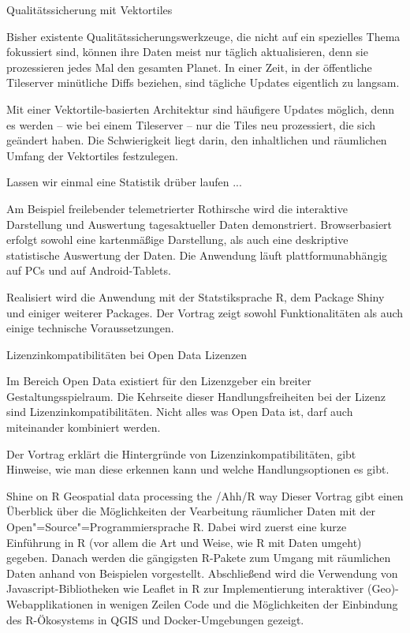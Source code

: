 %
{Qualitätssicherung mit Vektortiles}%
{}%
{Bisher existente Qualitätssicherungswerkzeuge, die nicht auf ein spezielles Thema fokussiert sind,
  können ihre Daten meist nur täglich aktualisieren, denn sie prozessieren jedes Mal den gesamten
  Planet. In einer Zeit, in der öffentliche Tileserver minütliche Diffs beziehen, sind tägliche
  Updates eigentlich zu langsam.

Mit einer Vektortile-basierten Architektur sind häufigere Updates möglich, denn es werden – wie bei
einem Tileserver – nur die Tiles neu prozessiert, die sich geändert haben. Die Schwierigkeit liegt
darin, den inhaltlichen und räumlichen Umfang der Vektortiles festzulegen.}

%
{Lassen wir einmal eine Statistik drüber laufen ...}%
{}%
{Am Beispiel freilebender telemetrierter Rothirsche wird die interaktive Darstellung und Auswertung
tagesaktueller Daten demonstriert. Browserbasiert erfolgt sowohl eine kartenmäßige Darstellung,
als auch eine deskriptive statistische Auswertung der Daten.
Die Anwendung läuft plattformunabhängig auf
PCs und auf Android-Tablets.

Realisiert wird die Anwendung mit der Statstiksprache R, dem Package Shiny und einiger weiterer
Packages. Der Vortrag zeigt sowohl Funktionalitäten als auch einige technische Voraussetzungen.}

%
{Lizenzinkompatibilitäten bei Open Data Lizenzen}%
{}%
{Im Bereich Open Data existiert für den Lizenzgeber ein breiter Gestaltungsspielraum. Die Kehrseite
  dieser Handlungsfreiheiten bei der Lizenz sind Lizenzinkompatibilitäten. Nicht alles was Open Data
  ist, darf auch miteinander kombiniert werden.

Der Vortrag erklärt die Hintergründe von Lizenzinkompatibilitäten, gibt Hinweise, wie man diese
erkennen kann und welche Handlungsoptionen es gibt.}

%
{Shine on R}%
{Geospatial data processing the /Ahh/R way}%
{Dieser Vortrag gibt einen Überblick über die Möglichkeiten der Vearbeitung räumlicher Daten mit der
  Open"=Source"=Programmiersprache R. Dabei wird zuerst eine kurze Einführung in R (vor allem die Art
  und Weise, wie R mit Daten umgeht) gegeben. Danach werden die gängigsten R-Pakete zum Umgang mit
  räumlichen Daten anhand von Beispielen vorgestellt. Abschließend wird die Verwendung von
  Javascript-Bibliotheken wie Leaflet in R zur Implementierung interaktiver (Geo)-Webapplikationen
  in wenigen Zeilen Code und die Möglichkeiten der Einbindung des R-Ökosystems in QGIS und
  Docker-Umgebungen gezeigt.}

